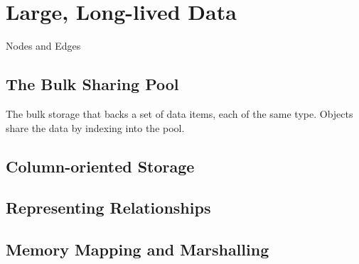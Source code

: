 
\chapter{Large, Long-lived Data}
\label{chapter:outisde-java-box}


\begin{example}{Nodes and Edges}

\end{example}

\section{The Bulk Sharing Pool}
\label{sec:bulk-sharing-pool}

The bulk storage that backs a set of data items, each of the same type. Objects
share the data by indexing into the pool.

\section{Column-oriented Storage}

\section{Representing Relationships}

\section{Memory Mapping and Marshalling}